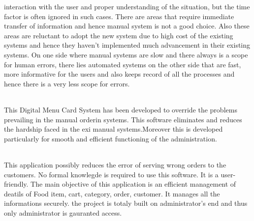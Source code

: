 \documentclass[12pt,a4paper]{report}
\begin{document}
interaction with the user and proper understanding of the
situation, but the time factor is often ignored in such cases.
There are areas that require immediate transfer of
information and hence manual system is not a good choice.
Also these areas are reluctant to adopt the new system due
to high cost of the existing systems and hence they haven't
implemented much advancement in their existing systems.
On one side where manual systems are slow and there
always is a scope for human errors, there lies automated
systems on the other side that are fast, more informative for
the users and also keeps record of all the processes and
hence there is a very less scope for errors.
\\
\\
\par
This Digital Menu Card System has been developed to override the problems prevailing in the manual orderin systems. This software eliminates and reduces the hardship faced in the exi manual systems.Moreover this is developed particularly for smooth and efficient functioning of the administration. 
\\
\\ 
\par
This application possibly reduces the error of serving wrong orders to the customers. No formal knowlegde is required to use this software. It is a user-friendly. The main objective of this application is an efficient management of deatils of Food item, cart, category, order, customer. It manages all the informations securely. the project is totaly built on administrator's end and thus only administrator is gauranted access.
\end{document}
